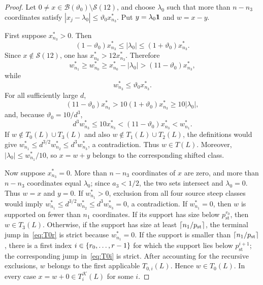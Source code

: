 \begin{proof}
Let $0\ne x\in\mathcal B(\vartheta_0)\setminus\mathcal S(12)$, and choose $\lambda_0$ such that more than $n-n_3$ coordinates satisfy $|x_j-\lambda_0|\le\vartheta_0x_{n_3}^*$. Put $y=\lambda_0\mathbf 1$ and $w=x-y$.

First suppose $x_{n_3}^*>0$. Then
\begin{equation}\label{eq:lambda0-bounds}
  (1-\vartheta_0)x_{n_3}^*
  \le|\lambda_0|
  \le(1+\vartheta_0)x_{n_3}^*.
\end{equation}
Since $x\notin\mathcal S(12)$, one has $x_{n_0}^*>12x_{n_3}^*$. Therefore
\[
  w_{n_1}^*\ge w_{n_0}^*
  \ge x_{n_0}^*-|\lambda_0|
  >(11-\vartheta_0)x_{n_3}^*,
\]
while
\[
  w_{n_3}^*\le\vartheta_0x_{n_3}^*.
\]
For all sufficiently large $d$,
\[
  (11-\vartheta_0)x_{n_3}^*
  >10(1+\vartheta_0)x_{n_3}^*
  \ge10|\lambda_0|,
\]
and, because $\vartheta_0=10/d^3$,
\[
  d^3w_{n_3}^*\le10x_{n_3}^*
  <(11-\vartheta_0)x_{n_3}^*
  <w_{n_1}^*.
\]
If $w\notin T_0(L)\cup T_3(L)$ and also $w\notin T_1(L)\cup T_2(L)$, the definitions would give $w_{n_1}^*\le d^{3/2}w_{n_2}^*\le d^3w_{n_3}^*$, a contradiction. Thus $w\in T(L)$. Moreover, $|\lambda_0|\le w_{n_1}^*/10$, so $x=w+y$ belongs to the corresponding shifted class.

Now suppose $x_{n_3}^*=0$. More than $n-n_3$ coordinates of $x$ are zero, and more than $n-n_3$ coordinates equal $\lambda_0$; since $a_3<1/2$, the two sets intersect and $\lambda_0=0$. Thus $w=x$ and $y=0$. If $w_{n_1}^*>0$, exclusion from all four source steep classes would imply $w_{n_1}^*\le d^{3/2}w_{n_2}^*\le d^3w_{n_3}^*=0$, a contradiction. If $w_{n_1}^*=0$, then $w$ is supported on fewer than $n_1$ coordinates. If its support has size below $p_{\mathrm{st}}^{r_0}$, then $w\in T_3(L)$. Otherwise, if the support has size at least $\left\lceil n_1/p_{\mathrm{st}}\right\rceil$, the terminal jump in~\eqref{eq:T0r} is strict because $w_{n_1}^*=0$. If the support is smaller than $\left\lceil n_1/p_{\mathrm{st}}\right\rceil$, there is a first index $i\in\left\{r_0,\ldots,r-1\right\}$ for which the support lies below $p_{\mathrm{st}}^{i+1}$; the corresponding jump in~\eqref{eq:T0i} is strict. After accounting for the recursive exclusions, $w$ belongs to the first applicable $T_{0,i}(L)$. Hence $w\in T_0(L)$. In every case $x=w+0\in T_i^{\mathcal K}(L)$ for some $i$.
\end{proof}

